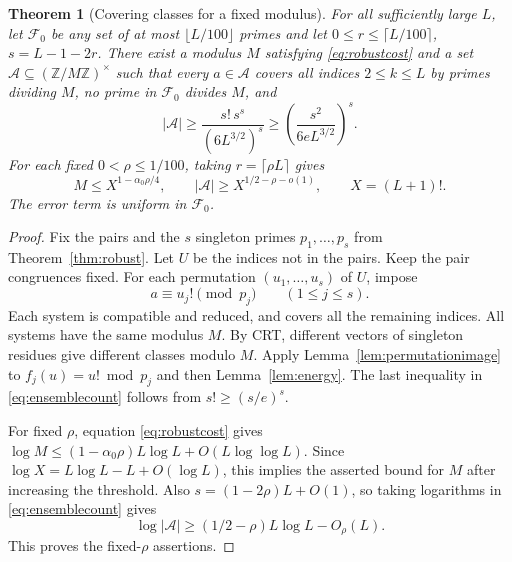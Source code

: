 \documentclass[11pt]{amsart}
\newtheorem{theorem}{Theorem}[section]
\theoremstyle{definition}
\theoremstyle{remark}
\begin{document}
\begin{theorem}[Covering classes for a fixed modulus]
\label{thm:ensemble}
For all sufficiently large $L$, let $\mathcal F_0$ be any set of at most
$\lfloor L/100\rfloor$ primes and let
$0\leq r\leq\lceil L/100\rceil$, $s=L-1-2r$.
There exist a modulus $M$ satisfying \eqref{eq:robustcost} and a set
$\mathcal A\subseteq(\mathbb Z/M\mathbb Z)^\times$ such that every
$a\in\mathcal A$ covers all indices $2\leq k\leq L$ by primes dividing
$M$, no prime in $\mathcal F_0$ divides $M$, and
\begin{equation}\label{eq:ensemblecount}
|\mathcal A|\geq
\frac{s!\,s^s}{(6L^{3/2})^s}
\geq\left(\frac{s^2}{6eL^{3/2}}\right)^s.
\end{equation}
For each fixed $0<\rho\leq1/100$, taking $r=\lceil\rho L\rceil$ gives
\[
M\leq X^{1-\alpha_0\rho/4},\qquad
|\mathcal A|\geq X^{1/2-\rho-o(1)},\qquad X=(L+1)!.
\]
The error term is uniform in $\mathcal F_0$.
\end{theorem}
\begin{proof}
Fix the pairs and the $s$ singleton primes $p_1,\ldots,p_s$ from
Theorem~\ref{thm:robust}. Let $U$ be the indices not in the pairs.
Keep the pair congruences fixed. For each permutation
$(u_1,\ldots,u_s)$ of $U$, impose
\[
a\equiv u_j!\pmod{p_j}\qquad(1\leq j\leq s).
\]
Each system is compatible and reduced, and covers all the remaining
indices. All systems have the same modulus $M$. By CRT, different
vectors of singleton residues give different classes modulo $M$.
Apply Lemma~\ref{lem:permutationimage} to $f_j(u)=u!\bmod p_j$ and
then Lemma~\ref{lem:energy}. The last inequality in
\eqref{eq:ensemblecount} follows from $s!\geq(s/e)^s$.

For fixed $\rho$, equation \eqref{eq:robustcost} gives
$\log M\leq(1-\alpha_0\rho)L\log L+O(L\log\log L)$.
Since $\log X=L\log L-L+O(\log L)$, this implies the asserted bound
for $M$ after increasing the threshold. Also $s=(1-2\rho)L+O(1)$,
so taking logarithms in \eqref{eq:ensemblecount} gives
\[
\log|\mathcal A|\geq(1/2-\rho)L\log L-O_\rho(L).
\]
This proves the fixed-$\rho$ assertions.
\end{proof}
\end{document}
